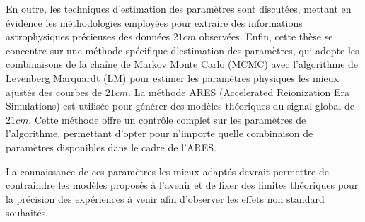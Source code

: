 \documentclass[12pt, TexShade, letterpaper]{report}
\begin{document}
En outre, les techniques d'estimation des paramètres sont discutées, mettant en évidence les méthodologies employées pour extraire des informations astrophysiques précieuses des données $21cm$ observées. Enfin, cette thèse se concentre sur une méthode spécifique d'estimation des paramètres, qui adopte les combinaisons de la chaîne de Markov Monte Carlo (MCMC) avec l'algorithme de Levenberg Marquardt (LM) pour estimer les paramètres physiques les mieux ajustés des courbes de $21cm$. La méthode ARES (Accelerated Reionization Era Simulations) est utilisée pour générer des modèles théoriques du signal global de $21cm$. Cette méthode offre un contrôle complet sur les paramètres de l'algorithme, permettant d'opter pour n'importe quelle combinaison de paramètres disponibles dans le cadre de l'ARES.\par

La connaissance de ces paramètres les mieux adaptés devrait permettre de contraindre les modèles proposés à l'avenir et de fixer des limites théoriques pour la précision des expériences à venir afin d'observer les effets non standard souhaités.\par
\end{document}
